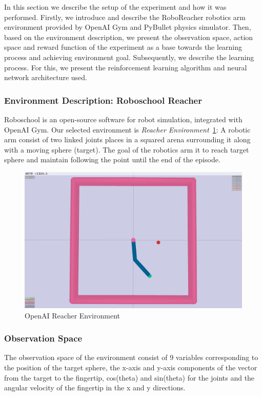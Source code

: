 In this section we describe the setup of the experiment and how it was performed. Firstly, we introduce and describe the RoboReacher robotics arm environment provided by OpenAI Gym and PyBullet physics simulator. Then, based on the environment description, we present the observation space, action space and reward function of the experiment as a base towards the learning process and achieving environment goal. Subsequently, we describe the learning process. For this, we present the reinforcement learning algorithm and neural network architecture used.


\subsubsection{Environment Description: Roboschool Reacher}
Roboschool is an open-source software for robot simulation, integrated with OpenAI Gym. Our selected environment is \textit{Reacher Environment}~\ref{fig:openai_reacher}: A robotic arm consist of two linked joints places in a squared arena surrounding it along with a moving sphere (target). The goal of the robotics arm it to reach target sphere and maintain following the point until the end of the episode. 

\begin{figure}[!htb]
		\centering
				\includegraphics[width=0.7\linewidth]{figures/envs/openai_roboreacher.png}
				\caption{OpenAI Reacher Environment}
				\label{fig:openai_reacher}
\end{figure}

\subsubsection{Observation Space}

The observation space of the environment consist of 9 variables corresponding to the position of the target sphere, the x-axis and y-axis components of the vector from the target to the fingertip, cos(theta) and sin(theta) for the joints and the angular velocity of the fingertip in the x and y directions.

